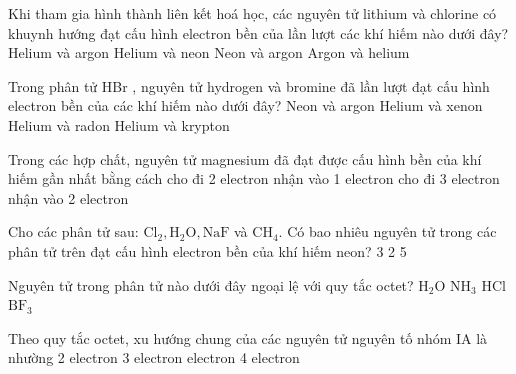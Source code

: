 \begin{ex}
	Khi tham gia hình thành liên kết hoá học, các nguyên tử lithium và chlorine có khuynh hướng đạt cấu hình electron bền của lần lượt các khí hiếm nào dưới đây?
	\choice
	{Helium và argon}
	{Helium và neon}
	{Neon và argon}
	{\True Argon và helium}
	\loigiai{}
\end{ex}

\begin{ex}
	Trong phân tử HBr , nguyên tử hydrogen và bromine đã lần lượt đạt cấu hình electron bền của các khí hiếm nào dưới đây?
	\choice
	{Neon và argon}
	{Helium và xenon}
	{Helium và radon}
	{\True Helium và krypton}
	\loigiai{}
\end{ex}

\begin{ex}
	Trong các hợp chất, nguyên tử magnesium đã đạt được cấu hình bền của khí hiếm gần nhất bằng cách
	\choice
	{\True cho đi 2 electron}
	{nhận vào 1 electron}
	{cho đi 3 electron}
	{nhận vào 2 electron}
\end{ex}

\begin{ex}
	Cho các phân tử sau: $\mathrm{Cl}_2, \mathrm{H}_2 \mathrm{O}, \mathrm{NaF}$ và $\mathrm{CH}_4$. Có bao nhiêu nguyên tử trong các phân tử trên đạt cấu hình electron bền của khí hiếm neon?
	\choice
	{3 }
	{2}
	{5 }
	{ }
\end{ex}

\begin{ex}
	Nguyên tử trong phân tử nào dưới đây ngoại lệ với quy tắc octet?
	\choice
	{$\mathrm{H}_2 \mathrm{O}$}
	{$\mathrm{NH}_3$}
	{HCl }
	{\True $\mathrm{BF}_3$}
\end{ex}
\begin{ex}
	Theo quy tắc octet, xu hướng chung của các nguyên tử nguyên tố nhóm IA là nhường
	\choice
	{2 electron}
	{3 electron}
	{ electron}
	{4 electron}
	\loigiai{}
\end{ex}

